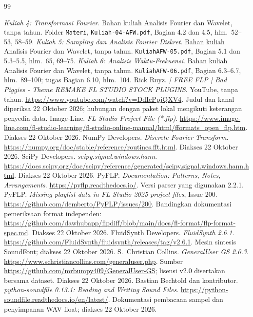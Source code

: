 \begin{thebibliography}{99}
\raggedright
{}\textit{Kuliah 4: Transformasi Fourier}. Bahan kuliah
Analisis Fourier dan Wavelet, tanpa tahun. Folder \texttt{Materi},
\texttt{Kuliah-04-AFW.pdf}, Bagian 4.2 dan 4.5, hlm.~52--53, 58--59.
\textit{Kuliah 5: Sampling dan Analisis Fourier Diskret}.
Bahan kuliah Analisis Fourier dan Wavelet, tanpa tahun.
\texttt{KuliahAFW-05.pdf}, Bagian 5.1 dan 5.3--5.5, hlm.~65, 69--75.
\textit{Kuliah 6: Analisis Waktu-Frekuensi}. Bahan kuliah
Analisis Fourier dan Wavelet, tanpa tahun. \texttt{KuliahAFW-06.pdf},
Bagian 6.3--6.7, hlm.~89--100; tugas Bagian 6.10, hlm.~104.
Rick Ruyz. \textit{[ FREE FLP ] Bad Piggies - Theme REMAKE
FL STUDIO STOCK PLUGINS}. YouTube, tanpa tahun.
\url{https://www.youtube.com/watch?v=DdIcPpjQXV4}.
Judul dan kanal diperiksa 22 Oktober 2026; hubungan dengan paket lokal
mengikuti keterangan penyedia data.
Image-Line. \textit{FL Studio Project File (*.flp)}.
\url{https://www.image-line.com/fl-studio-learning/fl-studio-online-manual/html/fformats_open_flp.htm}.
Diakses 22 Oktober 2026.
NumPy Developers. \textit{Discrete Fourier Transform}.
\url{https://numpy.org/doc/stable/reference/routines.fft.html}.
Diakses 22 Oktober 2026.
SciPy Developers. \textit{scipy.signal.windows.hann}.
\url{https://docs.scipy.org/doc/scipy/reference/generated/scipy.signal.windows.hann.html}.
Diakses 22 Oktober 2026.
PyFLP. \textit{Documentation: Patterns, Notes, Arrangements}.
\url{https://pyflp.readthedocs.io/}. Versi parser yang digunakan 2.2.1.
PyFLP. \textit{Missing playlist data in FL Studio 2025
project files}, Issue 200. \url{https://github.com/demberto/PyFLP/issues/200}.
Bandingkan dokumentasi pemeriksaan format independen:
\url{https://github.com/dawhubapp/flpdiff/blob/main/docs/fl-format/flp-format-spec.md}.
Diakses 22 Oktober 2026.
FluidSynth Developers. \textit{FluidSynth 2.6.1}.
\url{https://github.com/FluidSynth/fluidsynth/releases/tag/v2.6.1}.
Mesin sintesis SoundFont; diakses 22 Oktober 2026.
S.~Christian Collins. \textit{GeneralUser GS 2.0.3}.
\url{https://www.schristiancollins.com/generaluser.php}.
Sumber \url{https://github.com/mrbumpy409/GeneralUser-GS}; lisensi v2.0
disertakan bersama dataset. Diakses 22 Oktober 2026.
Bastian Bechtold dan kontributor.
\textit{python-soundfile 0.13.1: Reading and Writing Sound Files}.
\url{https://python-soundfile.readthedocs.io/en/latest/}.
Dokumentasi pembacaan sampel dan penyimpanan WAV float;
diakses 22 Oktober 2026.
\end{thebibliography}

